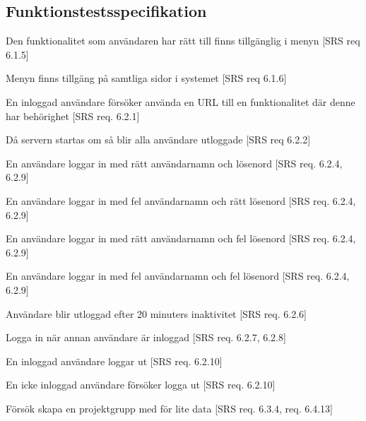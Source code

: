 \documentclass[a4paper]{article}
\begin{document}
\newpage

\begin{appendices}

\section{Funktionstestsspecifikation}


\begin{FT}



\item
Den funktionalitet som användaren har rätt till finns tillgänglig i menyn [SRS req 6.1.5]

\item
Menyn finns tillgäng på samtliga sidor i systemet [SRS req 6.1.6]

\item
En inloggad användare försöker använda en URL till en funktionalitet där denne har behörighet [SRS req. 6.2.1]

\item
Då servern startas om så blir alla användare utloggade [SRS req 6.2.2]

\item
En användare loggar in med rätt användarnamn och lösenord [SRS req. 6.2.4, 6.2.9]

\item
En användare loggar in med fel användarnamn och rätt lösenord [SRS req. 6.2.4, 6.2.9]

\item
En användare loggar in med rätt användarnamn och fel lösenord [SRS req. 6.2.4, 6.2.9]

\item
En användare loggar in med fel användarnamn och fel lösenord [SRS req. 6.2.4, 6.2.9]

\item 
Användare blir utloggad efter 20 minuters inaktivitet [SRS req. 6.2.6]

\item 
Logga in när annan användare är inloggad [SRS req. 6.2.7, 6.2.8]

\item
En inloggad användare loggar ut [SRS req. 6.2.10]

\item
En icke inloggad användare försöker logga ut [SRS req. 6.2.10]

\item 

Försök skapa en projektgrupp med för lite data [SRS req. 6.3.4, req. 6.4.13]


\end{FT}
\end{appendices}
\end{document}
